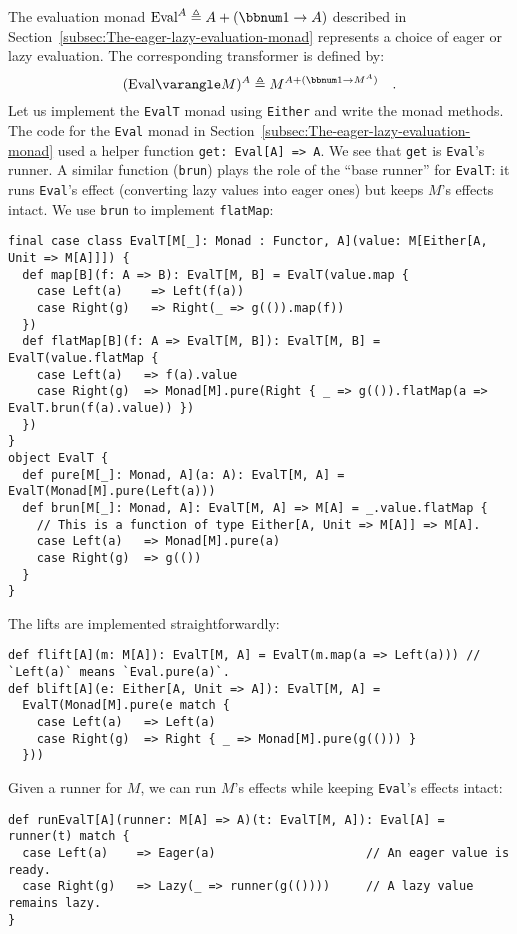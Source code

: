 The evaluation monad $\text{Eval}^{A}\triangleq A+\left(\bbnum 1\rightarrow A\right)$
described in Section~\ref{subsec:The-eager-lazy-evaluation-monad}
represents a choice of eager or lazy evaluation. The corresponding
transformer is defined by:
\[
(\text{Eval}\varangle M)^{A}\triangleq M^{A+(\bbnum 1\rightarrow M^{A})}\quad.
\]
Let us implement the \lstinline!EvalT! monad using \lstinline!Either!
and write the monad methods. The code for the \lstinline!Eval! monad
in Section~\ref{subsec:The-eager-lazy-evaluation-monad} used a helper
function \lstinline!get: Eval[A] => A!. We see that \lstinline!get!
is \lstinline!Eval!\textsf{'}s runner. A similar function (\lstinline!brun!)
plays the role of the \textsf{``}base runner\textsf{''} for \lstinline!EvalT!: it
runs \lstinline!Eval!\textsf{'}s effect (converting lazy values into eager
ones) but keeps $M$\textsf{'}s effects intact. We use \lstinline!brun! to
implement \lstinline!flatMap!:
\begin{lstlisting}
final case class EvalT[M[_]: Monad : Functor, A](value: M[Either[A, Unit => M[A]]]) {
  def map[B](f: A => B): EvalT[M, B] = EvalT(value.map {
    case Left(a)    => Left(f(a))
    case Right(g)   => Right(_ => g(()).map(f))
  })
  def flatMap[B](f: A => EvalT[M, B]): EvalT[M, B] = EvalT(value.flatMap {
    case Left(a)   => f(a).value
    case Right(g)  => Monad[M].pure(Right { _ => g(()).flatMap(a => EvalT.brun(f(a).value)) })
  })
}
object EvalT {
  def pure[M[_]: Monad, A](a: A): EvalT[M, A] = EvalT(Monad[M].pure(Left(a)))
  def brun[M[_]: Monad, A]: EvalT[M, A] => M[A] = _.value.flatMap {
    // This is a function of type Either[A, Unit => M[A]] => M[A].
    case Left(a)   => Monad[M].pure(a)
    case Right(g)  => g(())
  }
}
\end{lstlisting}

The lifts are implemented straightforwardly:
\begin{lstlisting}
def flift[A](m: M[A]): EvalT[M, A] = EvalT(m.map(a => Left(a))) // `Left(a)` means `Eval.pure(a)`.
def blift[A](e: Either[A, Unit => A]): EvalT[M, A] =
  EvalT(Monad[M].pure(e match {
    case Left(a)   => Left(a)
    case Right(g)  => Right { _ => Monad[M].pure(g(())) } 
  }))
\end{lstlisting}

Given a runner for $M$, we can run $M$\textsf{'}s effects while keeping \lstinline!Eval!\textsf{'}s
effects intact:
\begin{lstlisting}
def runEvalT[A](runner: M[A] => A)(t: EvalT[M, A]): Eval[A] = runner(t) match {
  case Left(a)    => Eager(a)                     // An eager value is ready.
  case Right(g)   => Lazy(_ => runner(g(())))     // A lazy value remains lazy.
}
\end{lstlisting}


